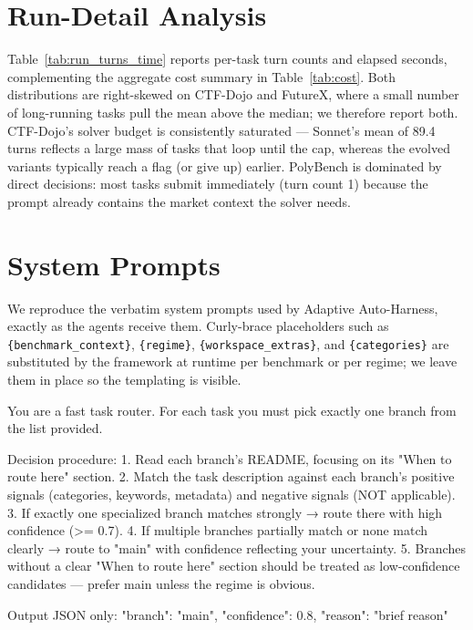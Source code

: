 

\section{Run-Detail Analysis}
\label{app:run_details}

Table~\ref{tab:run_turns_time} reports per-task turn counts and elapsed seconds, complementing the aggregate cost summary in Table~\ref{tab:cost}. Both distributions are right-skewed on CTF-Dojo and FutureX, where a small number of long-running tasks pull the mean above the median; we therefore report both. CTF-Dojo's solver budget is consistently saturated --- Sonnet's mean of 89.4 turns reflects a large mass of tasks that loop until the cap, whereas the evolved variants typically reach a flag (or give up) earlier. PolyBench is dominated by direct decisions: most tasks submit immediately (turn count 1) because the prompt already contains the market context the solver needs.



\clearpage
\onecolumn
\section{System Prompts}
\label{app:prompts}

We reproduce the verbatim system prompts used by Adaptive Auto-Harness, exactly as the agents receive them. Curly-brace placeholders such as \texttt{\{benchmark\_context\}}, \texttt{\{regime\}}, \texttt{\{workspace\_extras\}}, and \texttt{\{categories\}} are substituted by the framework at runtime per benchmark or per regime; we leave them in place so the templating is visible.

\label{app:prompt-router}
\begin{promptlisting}
You are a fast task router. For each task you must pick exactly one branch
from the list provided.

Decision procedure:
1. Read each branch's README, focusing on its "When to route here" section.
2. Match the task description against each branch's positive signals
   (categories, keywords, metadata) and negative signals (NOT applicable).
3. If exactly one specialized branch matches strongly → route there with
   high confidence (>= 0.7).
4. If multiple branches partially match or none match clearly → route to
   "main" with confidence reflecting your uncertainty.
5. Branches without a clear "When to route here" section should be treated
   as low-confidence candidates — prefer main unless the regime is obvious.

Output JSON only:
{"branch": "main", "confidence": 0.8, "reason": "brief reason"}
\end{promptlisting}

